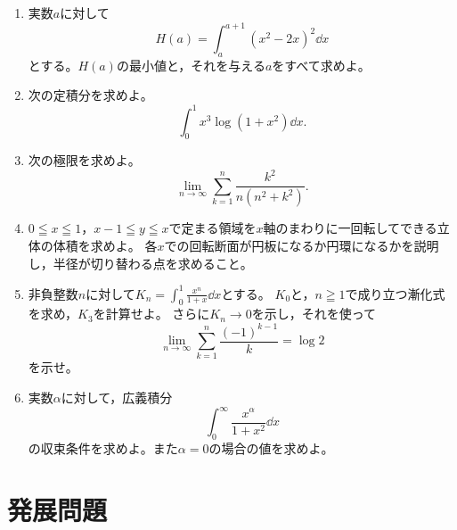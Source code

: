 \begin{enumerate}[label=\textbf{\thechapter.\arabic*},leftmargin=*,start=7]
 \item\label{問:総合七区間の最適化}
 実数$a$に対して
 \[
  H(a)=\int_a^{a+1}(x^2-2x)^2\dd x
 \]
 とする。$H(a)$の最小値と，それを与える$a$をすべて求めよ。
 \item\label{問:総合八置換と部分積分}
 次の定積分を求めよ。
 \[
  \int_0^1x^3\log(1+x^2)\dd x.
 \]
 \item\label{問:総合九区分求積}
 次の極限を求めよ。
 \[
  \lim_{n\to\infty}\sum_{k=1}^{n}\frac{k^2}{n(n^2+k^2)}.
 \]
 \item\label{問:総合十軸を横切る回転}
 $0\leqq x\leqq1$，$x-1\leqq y\leqq x$で定まる領域を$x$軸のまわりに一回転してできる立体の体積を求めよ。
 各$x$での回転断面が円板になるか円環になるかを説明し，半径が切り替わる点を求めること。
 \item\label{問:総合十一漸化式}
 非負整数$n$に対して$K_n=\int_0^1\frac{x^n}{1+x}\dd x$とする。
 $K_0$と，$n\geqq1$で成り立つ漸化式を求め，$K_3$を計算せよ。
 さらに$K_n\to0$を示し，それを使って
 \[
  \lim_{n\to\infty}\sum_{k=1}^{n}\frac{(-1)^{k-1}}{k}=\log2
 \]
 を示せ。
 \item\label{問:総合十二両端判定}
 実数$\alpha$に対して，広義積分
 \[
  \int_0^{\infty}\frac{x^\alpha}{1+x^2}\dd x
 \]
 の収束条件を求めよ。また$\alpha=0$の場合の値を求めよ。
\end{enumerate}

\section{発展問題}\label{節:総合発展}

